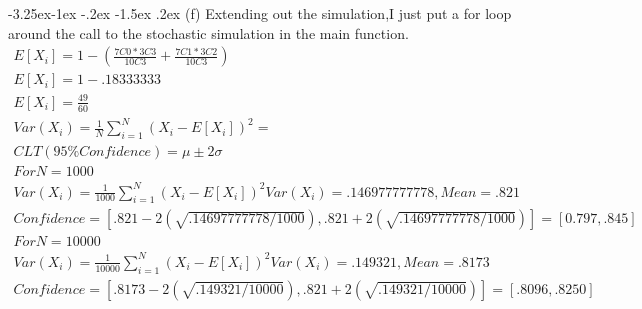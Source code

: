\documentclass[10pt]{article} %
\makeatletter
\renewcommand\subsection{\@startsection{subsection}{2}{\z@}%
                                     {-3.25ex\@plus -1ex \@minus -.2ex}%
                                     {-1.5ex \@plus .2ex}%
                                     {\normalfont\large\bfseries}}
\makeatother
\begin{document}
\subsection{(f)}
Extending out the simulation,I just put a for loop around the call to the stochastic simulation in the main function.
\begin{equation}
\begin{split}
E[X_i] = 1-(\frac{7C0 * 3C3}{10C3} + \frac{7C1 * 3C2}{10C3}) \\
E[X_i] = 1- .18333333\\
E[X_i] = \frac{49}{60}\\
Var(X_i) = \frac{1}{N}\sum_{i =1}^N(X_i-E[X_i])^2 = \\
CLT(95\% Confidence) = \mu \pm 2\sigma \\
For N = 1000 \\
Var(X_i) = \frac{1}{1000}\sum_{i =1}^N(X_i-E[X_i])^2
Var(X_i) = .146977777778, Mean = .821\\
Confidence = [.821 - 2(\sqrt{.14697777778/1000}),.821+2(\sqrt{.14697777778/1000})] =[0.797,.845]\\
For N = 10000 \\
Var(X_i) = \frac{1}{10000}\sum_{i =1}^N(X_i-E[X_i])^2
Var(X_i) = .149321, Mean = .8173\\
Confidence = [.8173 - 2(\sqrt{.149321/10000}),.821+2(\sqrt{.149321/10000})] =[.8096,.8250]\\
\end{split}
\end{equation}
\end{document}
